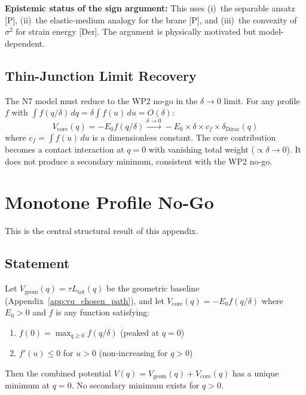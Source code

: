 \textbf{Epistemic status of the sign argument:} This uses
(i)~the separable ansatz [P], (ii)~the elastic-medium analogy for
the brane [P], and (iii)~the convexity of $\sigma^2$ for strain energy
[Der]. The argument is physically motivated but model-dependent.
\tagDcI

\subsection{Thin-Junction Limit Recovery}

The N7 model must reduce to the WP2 no-go in the $\delta \to 0$
limit. For any profile $f$ with $\int f(q/\delta)\, dq = \delta
\int f(u)\, du = O(\delta)$:
\begin{equation}
    V_{\mathrm{core}}(q) = -E_0 f(q/\delta)
    \xrightarrow{\delta \to 0}
    -E_0 \times \delta \times c_f \times \delta_{\mathrm{Dirac}}(q)
    \label{eq:N7_thin_limit}
\end{equation}
where $c_f = \int f(u)\, du$ is a dimensionless constant. The core
contribution becomes a contact interaction at $q = 0$ with vanishing
total weight ($\propto \delta \to 0$). It does not produce a secondary
minimum, consistent with the WP2 no-go. \tagDc

\section{Monotone Profile No-Go}
\label{sec:P2N7:nogo}

This is the central structural result of this appendix.

\subsection{Statement}

\begin{theorem}
\label{thm:monotone_nogo}
Let $V_{\mathrm{geom}}(q) = \tau L_{\mathrm{tot}}(q)$ be the geometric
baseline (Appendix~\ref{app:vq_chosen_path}), and let
$V_{\mathrm{core}}(q) = -E_0 f(q/\delta)$ where $E_0 > 0$ and
$f$ is any function satisfying:
\begin{enumerate}
    \item[(i)] $f(0) = \max_{q \geq 0} f(q/\delta)$
          \quad (peaked at $q = 0$)
    \item[(ii)] $f'(u) \leq 0$ for $u > 0$
          \quad (non-increasing for $q > 0$)
\end{enumerate}
Then the combined potential
$V(q) = V_{\mathrm{geom}}(q) + V_{\mathrm{core}}(q)$ has a unique
minimum at $q = 0$. No secondary minimum exists for $q > 0$.
\end{theorem}

